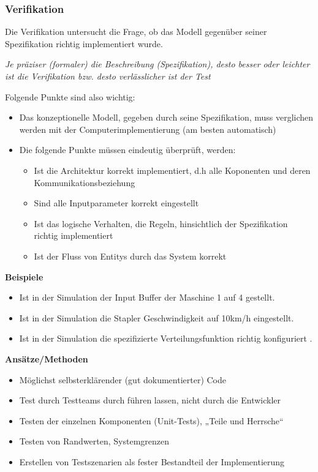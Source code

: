\subsubsection{Verifikation}
Die Verifikation untersucht die Frage, ob das Modell gegenüber seiner Spezifikation richtig implementiert wurde.

\textit{Je präziser (formaler) die Beschreibung (Spezifikation), desto besser oder leichter ist
die Verifikation bzw. desto verlässlicher ist der Test}


Folgende Punkte sind also wichtig:
\begin{itemize}
    \item Das konzeptionelle Modell, gegeben durch seine Spezifikation, muss verglichen werden mit der Computerimplementierung (am besten automatisch)
    \item Die folgende Punkte müssen eindeutig überprüft, werden:
    \begin{itemize}
        \item Ist die Architektur korrekt implementiert, d.h alle Koponenten und deren Kommunikationsbeziehung
        \item Sind alle Inputparameter korrekt eingestellt
        \item Ist das logische Verhalten, die Regeln, hinsichtlich der Spezifikation richtig implementiert
        \item Ist der Fluss von Entitys durch das System korrekt
    \end{itemize}
\end{itemize}
\newline

\textbf{Beispiele}
\begin{itemize}
    \item Ist in der Simulation der Input Buffer der Maschine 1 auf 4 gestellt.
    \item Ist in der Simulation die Stapler Geschwindigkeit auf 10km/h eingestellt.
    \item Ist in der Simulation die spezifizierte Verteilungsfunktion richtig konfiguriert .
\end{itemize}
\newline

\textbf{Ansätze/Methoden}
\begin{itemize}
    \item Möglichst selbsterklärender (gut dokumentierter) Code 
    \item Test durch Testteams durch führen lassen, nicht durch die Entwickler 
    \item Testen der einzelnen Komponenten (Unit-Tests), „Teile und Herrsche“ 
    \item Testen von Randwerten, Systemgrenzen 
    \item Erstellen von Testszenarien als fester Bestandteil der Implementierung 
\end{itemize}
 

